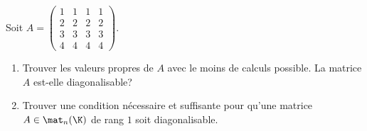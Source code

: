 \begin{enonce}
\begin{exercise}[ID={RMS133 E1410},subtitle={IMT PC 2022},tags={colle},difficulty={}]
  Soit $A=\begin{pmatrix} 1&1&1&1\\2&2&2&2\\ 3&3&3&3\\ 4&4&4&4 \end{pmatrix}$.
  \begin{enumerate}
    \item Trouver les valeurs propres de $A$ avec le moins de calculs possible.
      La matrice $A$ est-elle diagonalisable?

    \item Trouver une condition nécessaire et suffisante pour qu'une matrice $A\in\mat_n(\K)$ de rang $1$ soit diagonalisable.
  \end{enumerate}
\end{exercise}
\begin{solution}
\end{solution}
\end{enonce}
